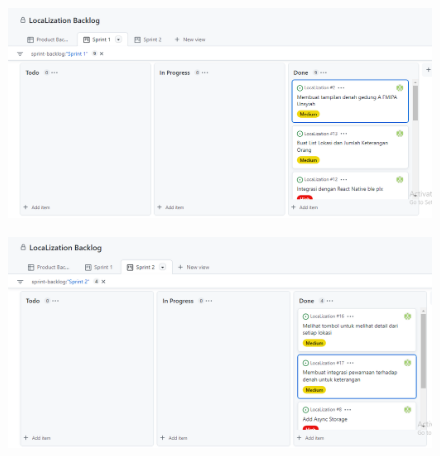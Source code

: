\begin{figure}[H]
  \center
  \includegraphics [width = 13.5 cm, height= 6.75 cm]{gambar/lampiran/sprint1.PNG}
\end{figure}
\begin{figure}[H]
  \center
  \includegraphics [width = 13.5 cm, height= 6.75 cm]{gambar/lampiran/sprint2.PNG}
\end{figure}




% 
% 

% 
% 